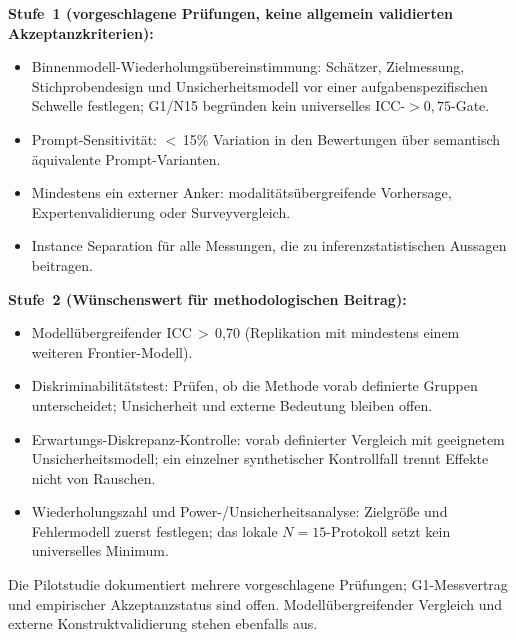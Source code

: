 \documentclass[11pt,a4paper]{article}
\begin{document}
\textbf{Stufe~1 (vorgeschlagene Prüfungen, keine allgemein validierten Akzeptanzkriterien):}
\begin{itemize}[nosep]
  \item Binnenmodell-Wiederholungsübereinstimmung: Schätzer, Zielmessung, Stichprobendesign und Unsicherheitsmodell vor einer aufgabenspezifischen Schwelle festlegen; G1/N15 begründen kein universelles ICC-$>0{,}75$-Gate.
  \item Prompt-Sensitivität: $<$\,15\% Variation in den Bewertungen über semantisch äquivalente Prompt-Varianten.
  \item Mindestens ein externer Anker: modalitätsübergreifende Vorhersage, Expertenvalidierung oder Surveyvergleich.
  \item Instance Separation für alle Messungen, die zu inferenzstatistischen Aussagen beitragen.
\end{itemize}

\textbf{Stufe~2 (Wünschenswert für methodologischen Beitrag):}
\begin{itemize}[nosep]
  \item Modellübergreifender ICC\,$>$\,0,70 (Replikation mit mindestens einem weiteren Frontier-Modell).
  \item Diskriminabilitätstest: Prüfen, ob die Methode vorab definierte Gruppen unterscheidet; Unsicherheit und externe Bedeutung bleiben offen.
  \item Erwartungs-Diskrepanz-Kontrolle: vorab definierter Vergleich mit geeignetem Unsicherheitsmodell; ein einzelner synthetischer Kontrollfall trennt Effekte nicht von Rauschen.
  \item Wiederholungszahl und Power-/Unsicherheitsanalyse: Zielgröße und Fehlermodell zuerst festlegen; das lokale $N=15$-Protokoll setzt kein universelles Minimum.
\end{itemize}

Die Pilotstudie dokumentiert mehrere vorgeschlagene Prüfungen; G1-Messvertrag und empirischer Akzeptanzstatus sind offen. Modellübergreifender Vergleich und externe Konstruktvalidierung stehen ebenfalls aus.
\end{document}

